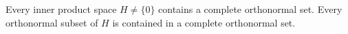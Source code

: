 Every inner product space $H \neq \{0\}$ contains a complete orthonormal set. Every orthonormal subset of $H$ is contained in a complete orthonormal set.
